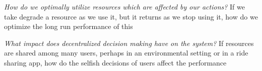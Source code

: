\documentclass[letterpaper, 10 pt, conference]{ieeeconf}
\begin{document}



\noindent\textit{How do we optimally utilize resources which are affected by our actions?} If we take degrade a resource as we use it, but it returns as we stop using it, how do we optimize the long run performance of this

\noindent\textit{What impact does decentralized decision making have on the system?} If resources are shared among many users, perhaps in an environmental setting or in a ride sharing app, how do the selfish decisions of users affect the performance
\end{document}
